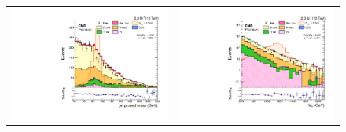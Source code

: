 \begin{figure}[!ht]
\begin{tabular}{cc}
\includegraphics[width=180pt]{Chapter6_plots/can_h_massZjj.pdf} &
\includegraphics[width=180pt]{Chapter6_plots/LOG_can_h_candTMass.pdf}\\
\end{tabular}
\label{fig:controlplots1}
\end{figure}